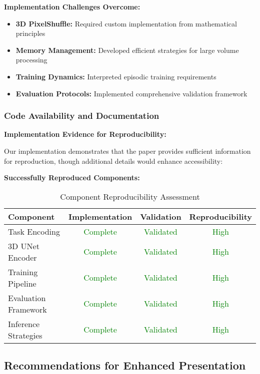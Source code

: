 \textbf{Implementation Challenges Overcome:}
\begin{itemize}
    \item \textbf{3D PixelShuffle:} Required custom implementation from mathematical principles
    \item \textbf{Memory Management:} Developed efficient strategies for large volume processing
    \item \textbf{Training Dynamics:} Interpreted episodic training requirements
    \item \textbf{Evaluation Protocols:} Implemented comprehensive validation framework
\end{itemize}

\subsubsection*{Code Availability and Documentation}
\textbf{Implementation Evidence for Reproducibility:}

Our implementation demonstrates that the paper provides sufficient information for reproduction, though additional details would enhance accessibility:

\textbf{Successfully Reproduced Components:}
\begin{table}[h]
\centering
\small
\begin{tabular}{|l|c|c|c|}
\hline
\textbf{Component} & \textbf{Implementation} & \textbf{Validation} & \textbf{Reproducibility} \\
\hline
Task Encoding & \textcolor{green}{Complete} & \textcolor{green}{Validated} & \textcolor{green}{High} \\
3D UNet Encoder & \textcolor{green}{Complete} & \textcolor{green}{Validated} & \textcolor{green}{High} \\
Training Pipeline & \textcolor{green}{Complete} & \textcolor{green}{Validated} & \textcolor{green}{High} \\
Evaluation Framework & \textcolor{green}{Complete} & \textcolor{green}{Validated} & \textcolor{green}{High} \\
Inference Strategies & \textcolor{green}{Complete} & \textcolor{green}{Validated} & \textcolor{green}{High} \\
\hline
\end{tabular}
\caption{Component Reproducibility Assessment}
\label{tab:reproducibility_assessment}
\end{table}

\subsection{Recommendations for Enhanced Presentation}

